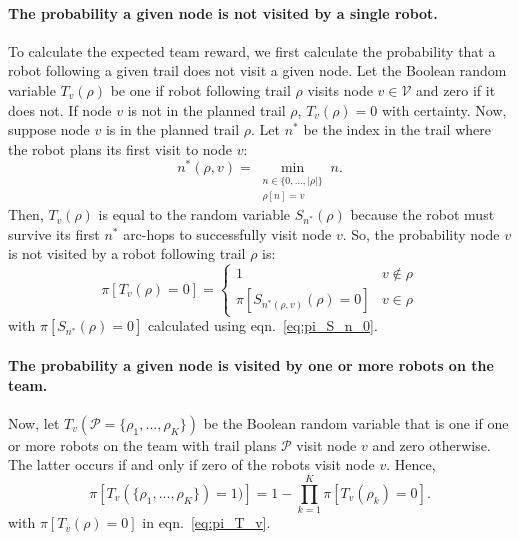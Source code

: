 \documentclass[11pt, oneside]{article}
\begin{document}
\paragraph{The probability a given node is not visited by a single robot.} 
To calculate the expected team reward, we first calculate the probability that a robot following a given trail does not visit a given node.
Let the Boolean random variable $T_v(\rho)$ be one if robot following trail $\rho$ visits node $v\in \mathcal{V}$ and zero if it does not.
If node $v$ is not in the planned trail $\rho$, $T_v(\rho)=0$ with certainty. 
Now, suppose node $v$ is in the planned trail $\rho$. Let $n^*$ be the index in the trail where the robot plans its first visit to node $v$:
\begin{equation}
n^*(\rho, v) = \min_{
	\substack{n \in \{0, ..., \lvert \rho \rvert\} \\ \rho[n] = v}
} n.
\end{equation}
Then, $T_v(\rho)$ is equal to the random variable $S_{n^*}(\rho)$ because the robot must survive its first $n^*$ arc-hops to successfully visit node $v$. 
So, the probability node $v$ is not visited by a robot following trail $\rho$ is:
\begin{equation}
	\pi[T_v(\rho) = 0] = 
	\begin{cases}
		1 & v\notin \rho\\
		 \pi [S_{n^*(\rho, v)}(\rho)=0 ] & v \in \rho
	\end{cases}
	 \label{eq:pi_T_v}
\end{equation}
with $\pi[S_{n^*}(\rho)=0]$ calculated using eqn.~\ref{eq:pi_S_n_0}.

\paragraph{The probability a given node is visited by one or more robots on the team.} 
Now, let $T_v(\mathcal{P}=\{\rho_1, ..., \rho_K\} )$ be the Boolean random variable that is one if one or more robots on the team with trail plans $\mathcal{P}$ visit node $v$ and zero otherwise.
The latter occurs if and only if zero of the robots visit node $v$. Hence,
\begin{equation}
	\pi [T_v(\{\rho_1, ..., \rho_K\} ) = 1)] = 
	1 - \prod_{k=1}^K \pi[T_v(\rho_k)=0].
	\label{eq:pi_T_v_all}
\end{equation} 
with $\pi[T_v(\rho) = 0]$ in eqn.~\ref{eq:pi_T_v}.
\end{document}
